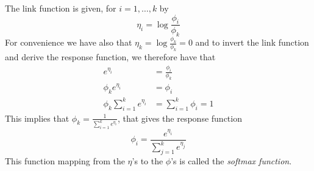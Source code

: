The link function is given, for $i = 1, \dots, k$ by
\[ \eta_i = \log \frac{\phi_i}{\phi_k} \]
For convenience we have also that $\eta_k = \log \frac{\phi_k}{\phi_k} = 0$ and to invert the link function
and derive the response function, we therefore have that
\begin{align*}
    e^{\eta_i} & = \frac{\phi_i}{\phi_k} \\
    \phi_k e^{\eta_i} & = \phi_i \\
    \phi_k \sum _{i=1} ^k e^{\eta_i} & = \sum _{i=1}^k \phi_i = 1 
\end{align*}
This implies that $\displaystyle \phi_k = \frac{1}{\sum _{i=1}^k e^{\eta_i}}$, that gives the response function
\[ \phi_i = \frac{e^{\eta_i}}{\sum _{j=1}^k e^{\eta_j}} \]
This function mapping from the $\eta$’s to the $\phi$’s is called the \emph{softmax function}.

